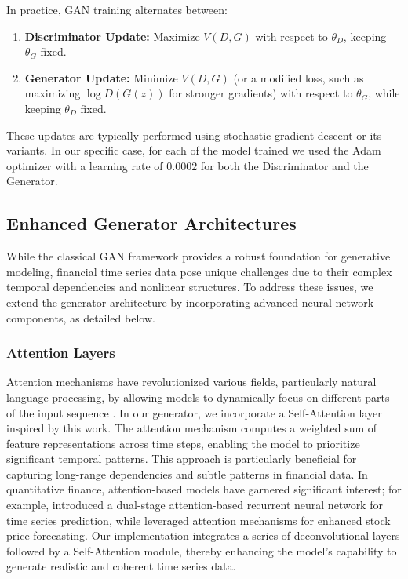 \documentclass{article}
\begin{document}
In practice, GAN training alternates between:
\begin{enumerate}
    \item \textbf{Discriminator Update:} Maximize $V(D, G)$ with respect to $\theta_D$, keeping $\theta_G$ fixed.
    \item \textbf{Generator Update:} Minimize $V(D, G)$ (or a modified loss, such as maximizing $\log D(G(z))$ for stronger gradients) with respect to $\theta_G$, while keeping $\theta_D$ fixed.
\end{enumerate}
These updates are typically performed using stochastic gradient descent or its variants. In our specific case, for each of the model trained we used the Adam optimizer with a learning rate of $ 0.0002 $ for both the Discriminator and the Generator.

\subsection*{Enhanced Generator Architectures}

While the classical GAN framework provides a robust foundation for generative modeling, financial time series data pose unique challenges due to their complex temporal dependencies and nonlinear structures. To address these issues, we extend the generator architecture by incorporating advanced neural network components, as detailed below.

\subsubsection*{Attention Layers}

Attention mechanisms have revolutionized various fields, particularly natural language processing, by allowing models to dynamically focus on different parts of the input sequence \textcite{vaswani_attention_2023}. In our generator, we incorporate a Self-Attention layer inspired by this work. The attention mechanism computes a weighted sum of feature representations across time steps, enabling the model to prioritize significant temporal patterns. This approach is particularly beneficial for capturing long-range dependencies and subtle patterns in financial data. In quantitative finance, attention-based models have garnered significant interest; for example, \textcite{qin_dual-stage_2017} introduced a dual-stage attention-based recurrent neural network for time series prediction, while \textcite{chen_exploring_2019} leveraged attention mechanisms for enhanced stock price forecasting. Our implementation integrates a series of deconvolutional layers followed by a Self-Attention module, thereby enhancing the model's capability to generate realistic and coherent time series data.
\end{document}
